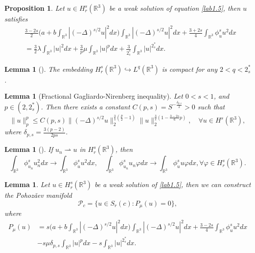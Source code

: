 \documentclass[11pt]{article}
\numberwithin{equation}{section}
\newtheorem{lemma}[theorem]{Lemma}
\newtheorem{proposition}[theorem]{Proposition}
\begin{document}
\begin{proposition}\label{pro2.2}
Let $u\in H^s_r(\mathbb{R}^3)$ be a weak solution of equation  \eqref{lab1.5},
then $u$ satisfies
\begin{align*}
&\frac{3-2s}{2}\Big(a+b\int_{\mathbb{R}^3}|(-\Delta)^{s/2}u|^2dx\Big)
 \int_{\mathbb{R}^3}|(-\Delta)^{s/2}u|^2dx
 +\frac{3+2s}{4}\int_{\mathbb{R}^3}\phi^s_u u^2dx\\
&=\frac{3}{2}\lambda \int_{\mathbb{R}^3}|u|^2dx
 +\frac{3}{p}\mu \int_{\mathbb{R}^3}|u|^pdx
 +\frac{3}{2^*_s}\int_{\mathbb{R}^3}|u|^{2^*_s}dx.
\end{align*}
\end{proposition}

\begin{lemma}[\cite{D1688}] \label{lem2.1311}
The embedding $H^s_r(\mathbb{R}^3)\hookrightarrow L^q(\mathbb{R}^3)$ is compact for
 any $2< q < 2^*_s$.
\end{lemma}

\begin{lemma}[Fractional Gagliardo-Nirenberg inequality] \label{lem3.2}
Let $0<s<1$, and $p\in(2, 2^*_s)$. Then there exists a constant
$C(p,s)=S^{-\frac{\delta_{p,s}}{2}}>0$ such that
\begin{equation}\label{3.2}
\|u\|^p_p\leq C(p,s)\|(-\Delta)^{s/2}u\|^{\frac{3}{s}(\frac{p}{2}-1)}_2
\|u\|^{\frac{3}{s}(1-\frac{3-2s}{6}p)}_2, \quad \forall u\in H^s(\mathbb{R}^3),
\end{equation}
where $\delta_{p,s}=\frac{3(p-2)}{2ps}$.
\end{lemma}

\begin{lemma}[\cite{D1678}] \label{lem2.171}
If $u_n\rightharpoonup u$ in $H^s_r(\mathbb{R}^3)$, then
\[
\int_{\mathbb{R}^3}\phi^s_{u_n}u^2_ndx\to \int_{\mathbb{R}^3}\phi^s_{u}u^2dx,\quad
\int_{\mathbb{R}^3}\phi^s_{u_n}u_n\varphi dx\to \int_{\mathbb{R}^3}\phi^s_{u}u\varphi dx, \forall \varphi\in H^s_r(\mathbb{R}^3).
\]
\end{lemma}

\begin{lemma}\label{lem3.5}
Let $u\in H^s_r(\mathbb{R}^3)$ be a weak solution of  \eqref{lab1.5},
then we can construct the Pohoz\v{a}ev manifold
$$
\mathcal{P}_c= \{u\in S_r(c) : P_\mu(u)=0 \},
$$
where
\begin{align*}
P_\mu(u)
&=s\Big(a+b\int_{\mathbb{R}^3}|(-\Delta)^{s/2}u|^2dx\Big)
 \int_{\mathbb{R}^3}|(-\Delta)^{s/2}u|^2dx
  +\frac{3-2s}{4}\int_{\mathbb{R}^3}\phi^s_u u^2dx\\
&-s\mu \delta_{p,s}\int_{\mathbb{R}^3}|u|^pdx-s\int_{\mathbb{R}^3}|u|^{2^*_s}dx.
\end{align*}
\end{lemma}
\end{document}
